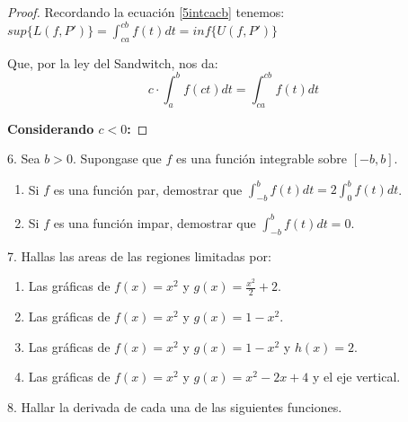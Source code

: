 \documentclass[12pt]{article}
\begin{document}
\begin{proof}
    Recordando la ecuaci\'on \eqref{5intcacb} tenemos: \(sup\{L(f,P')\}=\displaystyle\int_{ca}^{cb}f(t)dt=inf\{U(f,P')\}\)

    Que, por la ley del Sandwitch, nos da:
    \begin{equation}
        c\cdot\int_{a}^{b}f(ct)dt=\int_{ca}^{cb}f(t)dt
    \end{equation}

    \textbf{Considerando $c<0$:}\bigskip



\end{proof}

6. Sea $b>0$. Supongase que $f$ es una funci\'on integrable sobre $[-b,b]$.

\begin{enumerate}[\hspace{9px} a)]
    \item Si $f$ es una funci\'on par, demostrar que \(\displaystyle\int_{-b}^{b}f(t)dt=2\int_{0}^{b}f(t)dt\).

    \item Si $f$ es una funci\'on impar, demostrar que \(\displaystyle\int_{-b}^{b}f(t)dt=0\).

\end{enumerate}

7. Hallas las areas de las regiones limitadas por:

\begin{enumerate}[\hspace{9px} a)]
    \item Las gr\'aficas de \(f(x)=x^2\) y \(g(x)=\displaystyle\frac{x^2}{2}+2\).

    \item Las gr\'aficas de \(f(x)=x^2\) y \(g(x)=1-x^2\).

    \item Las gr\'aficas de \(f(x)=x^2\) y \(g(x)=1-x^2\) y \(h(x)=2\).

    \item Las gr\'aficas de \(f(x)=x^2\) y \(g(x)=x^2-2x+4\) y el eje vertical.

\end{enumerate}

8. Hallar la derivada de cada una de las siguientes funciones.
\end{document}
